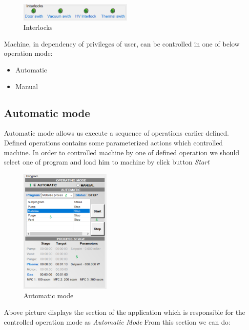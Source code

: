 	\begin{figure}[!h] 
	\centering \includegraphics[width=0.5\textwidth]{Graphic/MainScreen/Interlocks.png}	
	\caption{Interlocks}
	\label{interlocks}
	\end{figure}
	\FloatBarrier

Machine, in dependency of privileges of user, can be controlled in one of  below operation mode:

\begin{itemize}
	\item Automatic
	\item Manual
\end{itemize}

\subsection{Automatic mode}

Automatic mode allows us execute a sequence of operations earlier defined. Defined operations contains some parameterized actions which controlled machine. In order to controlled machine by one of defined operation we should select one of program and load him to machine by click button \textit{Start}

	\begin{figure}[!h] 
	\centering \includegraphics[width=0.4\textwidth]{Graphic/MainScreen/AutomaticMode.png}	
	\caption{Automatic mode}
	\label{automatic_mode}
	\end{figure}
	\FloatBarrier

Above picture displays the section of the application which is responsible for the controlled operation mode as \textit{Automatic Mode}
From this section we can do:

